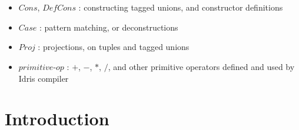 \documentclass[a1,portrait]{a1poster}
\begin{document}
\begin{multicols}{2}
\begin{multicols}{2}
\begin{minipage}[b]{1\linewidth}
\begin{bnf*}
    \\
    \\
    \\
    \\
    \\
    \\
    \\
    \\
    \\
    \\
    \\
    \\
\end{bnf*}
\end{minipage}
\end{multicols}

\vspace{-0.5cm}

\begin{itemize}
    \setlength\itemsep{-0.2em}
    \item $Cons$, $DefCons$ : constructing tagged unions, and constructor definitions
    \item $Case$ : pattern matching, or deconstructions
    \item $Proj$ : projections, on tuples and tagged unions
    \item $primitive$-$op$ : $+$, $-$, $*$, $/$, and other primitive operators defined and used by Idris compiler
\end{itemize}


\section*{Introduction}


\end{multicols}
\end{document}

